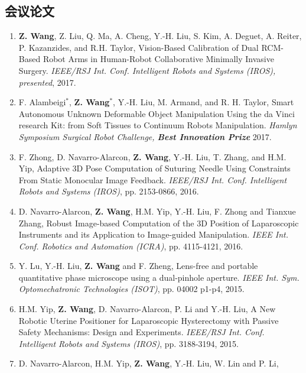 \documentclass[10pt,letterpaper]{article}
\begin{document}
\subsection*{会议论文}
\begin{enumerate}
    \item \textbf{Z. Wang}, Z. Liu, Q. Ma, A. Cheng, Y.-H. Liu, S. Kim, A. Deguet, A. Reiter, P. Kazanzides, and R.H. Taylor,
    Vision-Based Calibration of Dual RCM-Based Robot Arms in Human-Robot Collaborative Minimally Invasive Surgery.
    \textit{{IEEE/RSJ} Int. Conf. Intelligent Robots and Systems (IROS), presented}, 2017.
    \item F. Alambeigi$^*$, \textbf{Z. Wang}$^*$, Y.-H. Liu, M. Armand, and R. H. Taylor,
    Smart Autonomous Unknown Deformable Object Manipulation Using the da Vinci research Kit: from Soft Tissues to Continuum Robots Manipulation.
    \textit{Hamlyn Symposium Surgical Robot Challenge, \textbf{Best Innovation Prize}} 2017.
    \item F. Zhong, D. Navarro-Alarcon, \textbf{Z. Wang}, Y.-H. Liu, T. Zhang, and H.M. Yip,
    Adaptive 3D Pose Computation of Suturing Needle Using Constraints From Static Monocular Image Feedback.
    \textit{{IEEE/RSJ} Int. Conf. Intelligent Robots and Systems (IROS)}, pp. 2153-0866, 2016.
    \item D. Navarro-Alarcon, \textbf{Z. Wang}, H.M. Yip, Y.-H. Liu, F. Zhong and Tianxue Zhang,
    Robust Image-based Computation of the 3D Position of Laparoscopic Instruments and its Application to Image-guided Manipulation.
    \textit{{IEEE} Int. Conf. Robotics and Automation (ICRA)}, pp. 4115-4121, 2016.
    \item Y. Lu, Y.-H. Liu, \textbf{Z. Wang} and F. Zheng,
    Lens-free and portable quantitative phase microscope using a dual-pinhole aperture.
    \textit{{IEEE} Int. Sym. Optomechatronic Technologies (ISOT)}, pp. 04002 p1-p4, 2015.
    \item H.M. Yip, \textbf{Z. Wang}, D. Navarro-Alarcon, P. Li and Y.-H. Liu,
    A New Robotic Uterine Positioner for Laparoscopic Hysterectomy with Passive Safety Mechanisms: Design and Experiments.
    \textit{{IEEE/RSJ} Int. Conf. Intelligent Robots and Systems (IROS)}, pp. 3188-3194, 2015.
    \item D. Navarro-Alarcon, H.M. Yip, \textbf{Z. Wang}, Y.-H. Liu, W. Lin and P. Li,

\end{enumerate}
\end{document}
